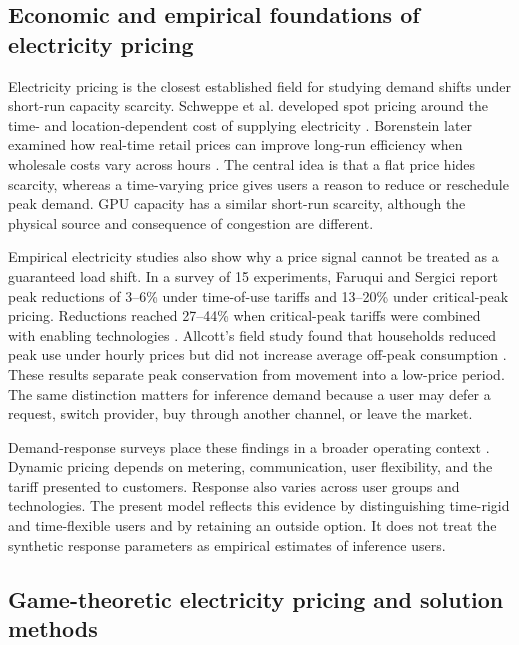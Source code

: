 \documentclass[11pt,a4paper]{article}
\begin{document}
\subsection{Economic and empirical foundations of electricity pricing}

Electricity pricing is the closest established field for studying demand shifts under short-run capacity scarcity. Schweppe et al. developed spot pricing around the time- and location-dependent cost of supplying electricity \cite{schweppe1988spot}. Borenstein later examined how real-time retail prices can improve long-run efficiency when wholesale costs vary across hours \cite{borenstein2005long}. The central idea is that a flat price hides scarcity, whereas a time-varying price gives users a reason to reduce or reschedule peak demand. GPU capacity has a similar short-run scarcity, although the physical source and consequence of congestion are different.

Empirical electricity studies also show why a price signal cannot be treated as a guaranteed load shift. In a survey of 15 experiments, Faruqui and Sergici report peak reductions of 3--6\% under time-of-use tariffs and 13--20\% under critical-peak pricing. Reductions reached 27--44\% when critical-peak tariffs were combined with enabling technologies \cite{faruqui2010household}. Allcott's field study found that households reduced peak use under hourly prices but did not increase average off-peak consumption \cite{allcott2011rethinking}. These results separate peak conservation from movement into a low-price period. The same distinction matters for inference demand because a user may defer a request, switch provider, buy through another channel, or leave the market.

Demand-response surveys place these findings in a broader operating context \cite{albadi2008summary,siano2014demand}. Dynamic pricing depends on metering, communication, user flexibility, and the tariff presented to customers. Response also varies across user groups and technologies. The present model reflects this evidence by distinguishing time-rigid and time-flexible users and by retaining an outside option. It does not treat the synthetic response parameters as empirical estimates of inference users.

\subsection{Game-theoretic electricity pricing and solution methods}
\end{document}
